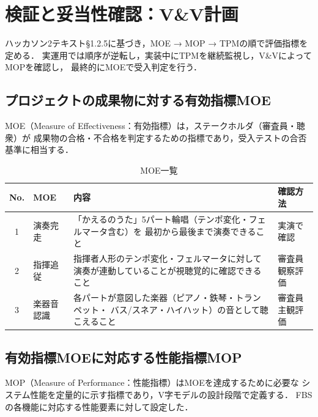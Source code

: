 \section{検証と妥当性確認：V\&V計画}

ハッカソン2テキスト§1.2.5に基づき，MOE → MOP → TPMの順で評価指標を定める．
実運用では順序が逆転し，実装中にTPMを継続監視し，V\&VによってMOPを確認し，
最終的にMOEで受入判定を行う．

\subsection{プロジェクトの成果物に対する有効指標MOE}

MOE（Measure of Effectiveness：有効指標）は，ステークホルダ（審査員・聴衆）が
成果物の合格・不合格を判定するための指標であり，受入テストの合否基準に相当する．

\begin{table}[H]
  \centering
  \begin{tabularx}{\linewidth}{clXl}
    \toprule
    No. & MOE & 内容 & 確認方法 \\
    \midrule
    1 & 演奏完走 &
      「かえるのうた」5パート輪唱（テンポ変化・フェルマータ含む）を
      最初から最後まで演奏できること &
      実演で確認 \\
    2 & 指揮追従 &
      指揮者人形のテンポ変化・フェルマータに対して
      演奏が連動していることが視聴覚的に確認できること &
      審査員観察評価 \\
    3 & 楽器音認識 &
      各パートが意図した楽器（ピアノ・鉄琴・トランペット・
      バス/スネア・ハイハット）の音として聴こえること &
      審査員主観評価 \\
    \bottomrule
  \end{tabularx}
  \caption{MOE一覧}
  \label{tab:moe}
\end{table}

\subsection{有効指標MOEに対応する性能指標MOP}

MOP（Measure of Performance：性能指標）はMOEを達成するために必要な
システム性能を定量的に示す指標であり，V字モデルの設計段階で定義する．
FBSの各機能に対応する性能要素に対して設定した．

